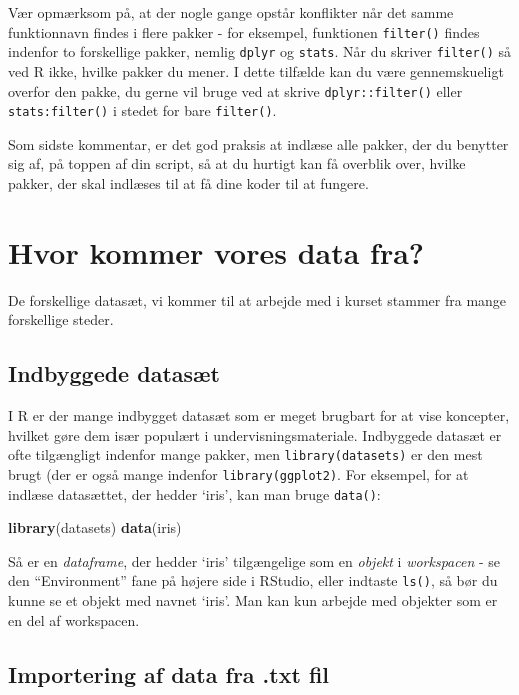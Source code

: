 \documentclass[
]{book}
\newenvironment{Shaded}{\begin{snugshade}}{\end{snugshade}}
\newcommand{\FunctionTok}[1]{\textcolor[rgb]{0.27,0.27,0.27}{\textbf{#1}}}
\newcommand{\NormalTok}[1]{#1}
\begin{document}
Vær opmærksom på, at der nogle gange opstår konflikter når det samme funktionnavn findes i flere pakker - for eksempel, funktionen \texttt{filter()} findes indenfor to forskellige pakker, nemlig \texttt{dplyr} og \texttt{stats}. Når du skriver \texttt{filter()} så ved R ikke, hvilke pakker du mener. I dette tilfælde kan du være gennemskueligt overfor den pakke, du gerne vil bruge ved at skrive \texttt{dplyr::filter()} eller \texttt{stats:filter()} i stedet for bare \texttt{filter()}.

Som sidste kommentar, er det god praksis at indlæse alle pakker, der du benytter sig af, på toppen af din script, så at du hurtigt kan få overblik over, hvilke pakker, der skal indlæses til at få dine koder til at fungere.

\section{Hvor kommer vores data fra?}\label{hvor-kommer-vores-data-fra}

De forskellige datasæt, vi kommer til at arbejde med i kurset stammer fra mange forskellige steder.

\subsection{Indbyggede datasæt}\label{indbyggede-datasuxe6t}

I R er der mange indbygget datasæt som er meget brugbart for at vise koncepter, hvilket gøre dem især populært i undervisningsmateriale. Indbyggede datasæt er ofte tilgængligt indenfor mange pakker, men \texttt{library(datasets)} er den mest brugt (der er også mange indenfor \texttt{library(ggplot2)}. For eksempel, for at indlæse datasættet, der hedder `iris', kan man bruge \texttt{data()}:

\begin{Shaded}
\begin{Highlighting}[]
\FunctionTok{library}\NormalTok{(datasets)}
\FunctionTok{data}\NormalTok{(iris)}
\end{Highlighting}
\end{Shaded}

Så er en \emph{dataframe}, der hedder `iris' tilgængelige som en \emph{objekt} i \emph{workspacen} - se den ``Environment'' fane på højere side i RStudio, eller indtaste \texttt{ls()}, så bør du kunne se et objekt med navnet `iris'. Man kan kun arbejde med objekter som er en del af workspacen.

\subsection{Importering af data fra .txt fil}\label{importering-af-data-fra-.txt-fil}
\end{document}
